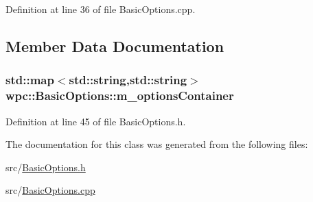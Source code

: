 Definition at line 36 of file Basic\-Options.\-cpp.



\subsection{Member Data Documentation}
\hypertarget{classwpc_1_1_basic_options_a6a023610b86624f5b037d030be9f385c}{
\subsubsection[{m\-\_\-options\-Container}]{\setlength{\rightskip}{0pt plus 5cm}std\-::map$<$std\-::string,std\-::string$>$ wpc\-::\-Basic\-Options\-::m\-\_\-options\-Container\hspace{0.3cm}{\ttfamily [private]}}}\label{classwpc_1_1_basic_options_a6a023610b86624f5b037d030be9f385c}


Definition at line 45 of file Basic\-Options.\-h.



The documentation for this class was generated from the following files\-:\begin{DoxyCompactItemize}
\item 
src/\hyperlink{_basic_options_8h}{Basic\-Options.\-h}\item 
src/\hyperlink{_basic_options_8cpp}{Basic\-Options.\-cpp}\end{DoxyCompactItemize}

